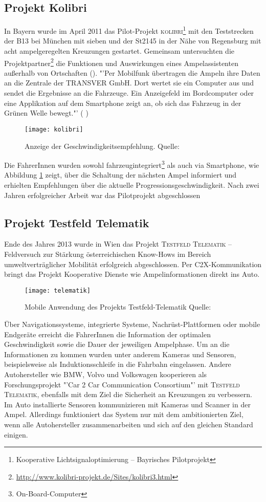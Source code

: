 \subsection*{\label{sec:kolibri}Projekt Kolibri}
In Bayern wurde im April 2011 das Pilot-Projekt \textsc{kolibri}\footnote{ Kooperative Lichtsignaloptimierung -- Bayrisches Pilotprojekt} mit den Teststrecken der B13 bei München mit sieben und der St2145 in der Nähe von Regensburg mit acht ampelgeregelten Kreuzungen gestartet. Gemeinsam untersuchten die Projektpartner\footnote{ \url{http://www.kolibri-projekt.de/Sites/kolibri3.html}} die Funktionen und Auswirkungen eines Ampelassistenten außerhalb von Ortschaften (\cite{kolibri}). "'Per Mobilfunk übertragen die Ampeln ihre Daten an die Zentrale der TRANSVER GmbH. Dort wertet sie ein Computer aus und sendet die Ergebnisse an die Fahrzeuge. Ein Anzeigefeld im Bordcomputer oder eine Applikation auf dem \gls{Smartphone} zeigt an, ob sich das Fahrzeug in der Grünen Welle bewegt."' (\cite{kolibriTUM} ) 
\begin{figure}[H]  
    \centering  
    \texttt{[image: kolibri]}      
    \caption[Projekt Kolibri]{Anzeige der Geschwindigkeitsempfehlung. Quelle: \cite{kolibri}}
    \label{fig:kolibri}
\end{figure}
Die FahrerInnen wurden sowohl fahrzeugintegriert\footnote{ On-Board-Computer} als auch via \gls{Smartphone}, wie Abbildung \ref{fig:kolibri} zeigt, über die Schaltung der nächsten Ampel informiert und erhielten Empfehlungen über die aktuelle Progressionsgeschwindigkeit. Nach zwei Jahren erfolgreicher Arbeit war das Pilotprojekt abgeschlossen 
\subsection*{Projekt Testfeld Telematik}
Ende des Jahres 2013 wurde in Wien das Projekt \textsc{Testfeld Telematik} -- Feldversuch zur Stärkung österreichischen Know-Hows im Bereich umweltverträglicher Mobilität erfolgreich abgeschlossen. Per \gls{C2X}-Kommunikation bringt das Projekt Kooperative Dienste wie Ampelinformationen direkt ins Auto. 
\begin{figure}[H]
    \centering
    \texttt{[image: telematik]} \label{fig:telematik}
    \caption[Projekt Testfeld-Telematik Ampelinformation]{Mobile Anwendung des Projekts Testfeld-Telematik Quelle: \cite{Telematik}}
\end{figure} 
Über Navigationssysteme, integrierte Systeme, Nachrüst-Plattformen oder mobile Endgeräte erreicht die FahrerInnen die Information der optimalen Geschwindigkeit sowie die Dauer der jeweiligen Ampelphase\cite{Telematik}. Um an die Informationen zu kommen wurden unter anderem Kameras und Sensoren, beispielsweise als Induktionsschleife in die Fahrbahn eingelassen. Andere Autohersteller wie BMW, Volvo und Volkswagen kooperieren als Forschungsprojekt "'Car 2 Car Communication Consortium"' mit \textsc{Testfeld Telematik}, ebenfalls mit dem Ziel die Sicherheit an Kreuzungen zu verbessern. Im Auto installierte Sensoren kommunizieren mit Kameras und Scanner in der Ampel. Allerdings funktioniert das System nur mit dem ambitionierten Ziel, wenn alle Autohersteller zusammenarbeiten und sich auf den gleichen Standard einigen. \cite{Siemens}
